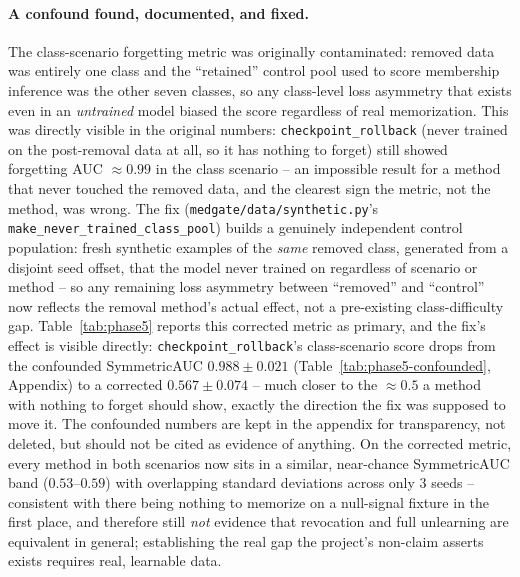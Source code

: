 \documentclass[11pt]{article}
\begin{document}
\paragraph{A confound found, documented, and fixed.} The class-scenario
forgetting metric was originally contaminated: removed data was entirely
one class and the ``retained'' control pool used to score membership
inference was the other seven classes, so any class-level loss asymmetry
that exists even in an \emph{untrained} model biased the score regardless
of real memorization. This was directly visible in the original numbers:
\texttt{checkpoint\_rollback} (never trained on the post-removal data at
all, so it has nothing to forget) still showed forgetting AUC
$\approx 0.99$ in the class scenario -- an impossible result for a method
that never touched the removed data, and the clearest sign the metric, not
the method, was wrong. The fix (\texttt{medgate/data/synthetic.py}'s
\texttt{make\_never\_trained\_class\_pool}) builds a genuinely independent
control population: fresh synthetic examples of the \emph{same} removed
class, generated from a disjoint seed offset, that the model never trained
on regardless of scenario or method -- so any remaining loss asymmetry
between ``removed'' and ``control'' now reflects the removal method's
actual effect, not a pre-existing class-difficulty gap. Table~\ref{tab:phase5}
reports this corrected metric as primary, and the fix's effect is visible
directly: \texttt{checkpoint\_rollback}'s class-scenario score drops from
the confounded SymmetricAUC $0.988 \pm 0.021$ (Table~\ref{tab:phase5-confounded},
Appendix) to a corrected $0.567 \pm 0.074$ -- much closer to the $\approx 0.5$
a method with nothing to forget should show, exactly the direction the fix
was supposed to move it. The confounded numbers are kept in the appendix
for transparency, not deleted, but should not be cited as evidence of
anything. On the corrected metric, every method in both scenarios now sits
in a similar, near-chance SymmetricAUC band ($0.53$--$0.59$) with
overlapping standard deviations across only 3 seeds -- consistent with
there being nothing to memorize on a null-signal fixture in the first
place, and therefore still \emph{not} evidence that revocation and full
unlearning are equivalent in general; establishing the real gap the
project's non-claim asserts exists requires real, learnable data.
\end{document}
